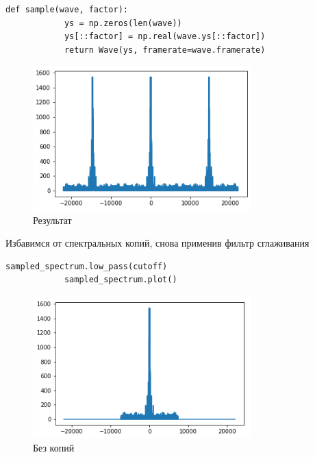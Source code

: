 \documentclass[a4paper,12pt]{article}
\begin{document}
\begin{enumerate}
\begin{lstlisting}[caption=Отображаем результат]
			def sample(wave, factor):
			ys = np.zeros(len(wave))
			ys[::factor] = np.real(wave.ys[::factor])
			return Wave(ys, framerate=wave.framerate) 
		\end{lstlisting}
		\begin{figure}[H]
			\centering
			\includegraphics[width=0.75\textwidth]{3_4.png}
			\caption{Результат}
			\label{fig:3.4}
		\end{figure}
		
		 
		Избавимся от спектральных копий, снова применив фильтр сглаживания
		\begin{lstlisting}[caption=Избавляемся от спектральных копий]
			sampled_spectrum.low_pass(cutoff)
			sampled_spectrum.plot()
		\end{lstlisting}
		\begin{figure}[H]
			\centering
			\includegraphics[width=0.75\textwidth]{3_5.png}
			\caption{Без копий}
			\label{fig:3.5}
		\end{figure}
	

\end{enumerate}
\end{document}
